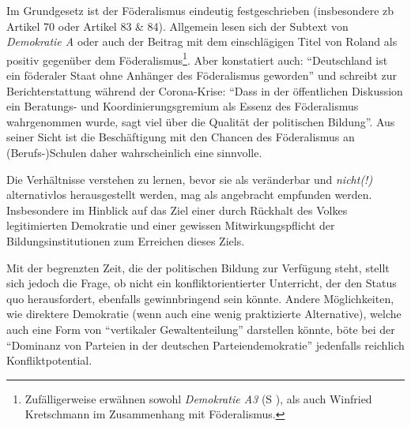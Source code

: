 Im Grundgesetz ist der Föderalismus eindeutig festgeschrieben (insbesondere \gls{zb} Artikel 70 oder Artikel 83 \& 84). %
Allgemein lesen sich der Subtext von \emph{Demokratie A} oder auch der Beitrag mit dem einschlägigen Titel  von Roland \textcite{Sturm.2021} als positiv gegenüber dem Föderalismus\footnote{
    Zufälligerweise erwähnen sowohl \emph{Demokratie A3} (\gls{S} \pageref{DEMOKRATIE-A3}), als auch \textcite[397]{Sturm.2021}  Winfried Kretschmann im Zusammenhang mit Föderalismus.
}. Aber \citeauthor{Sturm.2021} konstatiert auch: \enquote{Deutschland ist ein föderaler Staat ohne Anhänger des Föderalismus geworden} \autocite[397]{Sturm.2021} und schreibt zur Berichterstattung während der Corona-Krise: \enquote{Dass in der öffentlichen Diskussion ein Beratungs- und Koordinierungsgremium als Essenz des Föderalismus wahrgenommen wurde, sagt viel über die Qualität der politischen Bildung}. Aus seiner Sicht ist die Beschäftigung mit den Chancen des Föderalismus an (Berufs-)Schulen daher wahrscheinlich eine sinnvolle. 

Die Verhältnisse verstehen zu lernen, bevor sie als veränderbar und \emph{nicht(!)} alternativlos herausgestellt werden, mag als angebracht empfunden werden. Insbesondere im Hinblick auf das Ziel einer durch Rückhalt des Volkes legitimierten Demokratie und einer gewissen Mitwirkungspflicht der Bildungsinstitutionen zum Erreichen dieses Ziels.

Mit der begrenzten Zeit, die der politischen Bildung zur Verfügung steht, stellt sich jedoch die Frage, ob nicht ein konfliktorientierter Unterricht, der den Status quo herausfordert, ebenfalls gewinnbringend sein könnte. Andere Möglichkeiten, wie direktere Demokratie (wenn auch eine wenig praktizierte Alternative), welche auch eine Form von \enquote{vertikaler Gewaltenteilung} darstellen könnte, böte bei der \enquote{Dominanz von Parteien in der deutschen Parteiendemokratie} \autocite[401]{Sturm.2021} jedenfalls reichlich Konfliktpotential. 

